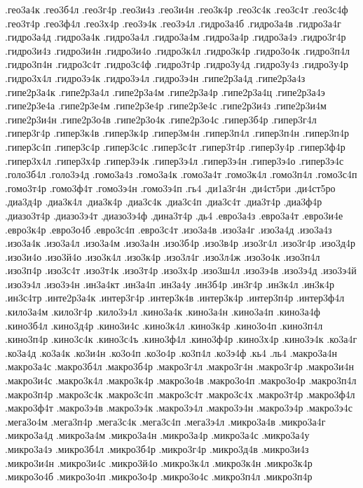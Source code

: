 {.гео3а4к
.гео3б4л
.гео3г4р
.гео3и4з
.гео3и4н
.гео3к4р
.гео3с4к
.гео3с4т
.гео3с4ф
.гео3т4р
.гео3ф4л
.гео3х4р
.гео3э4к
.гео3э4л
.гидро3а4б
.гидро3а4в
.гидро3а4г
.гидро3а4д
.гидро3а4к
.гидро3а4л
.гидро3а4м
.гидро3а4р
.гидро3а4э
.гидро3г4р
.гидро3и4з
.гидро3и4н
.гидро3и4о
.гидро3к4л
.гидро3к4р
.гидро3о4к
.гидро3п4л
.гидро3п4н
.гидро3с4т
.гидро3с4ф
.гидро3т4р
.гидро3у4д
.гидро3у4з
.гидро3у4р
.гидро3х4л
.гидро3э4к
.гидро3э4л
.гидро3э4н
.гипе2р3а4д
.гипе2р3а4з
.гипе2р3а4к
.гипе2р3а4л
.гипе2р3а4м
.гипе2р3а4р
.гипе2р3а4ц
.гипе2р3а4э
.гипе2р3е4а
.гипе2р3е4м
.гипе2р3е4р
.гипе2р3е4с
.гипе2р3и4з
.гипе2р3и4м
.гипе2р3и4н
.гипе2р3о4в
.гипе2р3о4к
.гипе2р3о4с
.гипер3б4р
.гипер3г4л
.гипер3г4р
.гипер3к4в
.гипер3к4р
.гипер3м4н
.гипер3п4л
.гипер3п4н
.гипер3п4р
.гипер3с4п
.гипер3с4р
.гипер3с4с
.гипер3с4т
.гипер3т4р
.гипер3у4р
.гипер3ф4р
.гипер3х4л
.гипер3х4р
.гипер3э4к
.гипер3э4л
.гипер3э4н
.гипер3э4о
.гипер3э4с
.голо3б4л
.голо3э4д
.гомо3а4з
.гомо3а4к
.гомо3а4т
.гомо3к4л
.гомо3п4л
.гомо3с4п
.гомо3т4р
.гомо3ф4т
.гомо3э4н
.гомо3э4п
.гь4
.ди1а3г4н
.ди4ст5ри
.ди4ст5ро
.диа3д4р
.диа3к4л
.диа3к4р
.диа3с4к
.диа3с4п
.диа3с4т
.диа3т4р
.диа3ф4р
.диазо3т4р
.диазо3э4т
.диазо3э4ф
.дина3т4р
.дь4
.евро3а4з
.евро3а4т
.евро3и4е
.евро3к4р
.евро3о4б
.евро3с4п
.евро3с4т
.изо3а4в
.изо3а4г
.изо3а4д
.изо3а4з
.изо3а4к
.изо3а4л
.изо3а4м
.изо3а4н
.изо3б4р
.изо3в4р
.изо3г4л
.изо3г4р
.изо3д4р
.изо3и4о
.изо3й4о
.изо3к4л
.изо3к4р
.изо3л4г
.изо3л4ж
.изо3о4к
.изо3п4л
.изо3п4р
.изо3с4т
.изо3т4к
.изо3т4р
.изо3х4р
.изо3ш4л
.изо3э4в
.изо3э4д
.изо3э4й
.изо3э4л
.изо3э4н
.ин3а4кт
.ин3а4п
.ин3а4у
.ин3б4р
.ин3г4р
.ин3к4л
.ин3к4р
.ин3с4тр
.инте2р3а4к
.интер3г4р
.интер3к4в
.интер3к4р
.интер3п4р
.интер3ф4л
.кило3а4м
.кило3г4р
.кило3э4л
.кино3а4к
.кино3а4н
.кино3а4п
.кино3а4ф
.кино3б4л
.кино3д4р
.кино3и4с
.кино3к4л
.кино3к4р
.кино3о4п
.кино3п4л
.кино3п4р
.кино3с4к
.кино3с4ъ
.кино3ф4л
.кино3ф4р
.кино3х4р
.кино3э4к
.ко3а4г
.ко3а4д
.ко3а4к
.ко3и4н
.ко3о4п
.ко3о4р
.ко3п4л
.ко3э4ф
.кь4
.ль4
.макро3а4н
.макро3а4с
.макро3б4л
.макро3б4р
.макро3г4л
.макро3г4н
.макро3г4р
.макро3и4н
.макро3и4с
.макро3к4л
.макро3к4р
.макро3о4в
.макро3о4п
.макро3о4р
.макро3п4л
.макро3п4р
.макро3с4к
.макро3с4п
.макро3с4т
.макро3с4х
.макро3т4р
.макро3ф4л
.макро3ф4т
.макро3э4в
.макро3э4к
.макро3э4л
.макро3э4н
.макро3э4р
.макро3э4с
.мега3о4м
.мега3п4р
.мега3с4к
.мега3с4п
.мега3э4л
.микро3а4в
.микро3а4г
.микро3а4д
.микро3а4м
.микро3а4н
.микро3а4р
.микро3а4с
.микро3а4у
.микро3а4э
.микро3б4л
.микро3б4р
.микро3г4р
.микро3д4в
.микро3и4з
.микро3и4н
.микро3и4с
.микро3й4о
.микро3к4л
.микро3к4н
.микро3к4р
.микро3о4б
.микро3о4п
.микро3о4р
.микро3о4с
.микро3п4л
.микро3п4р
}
